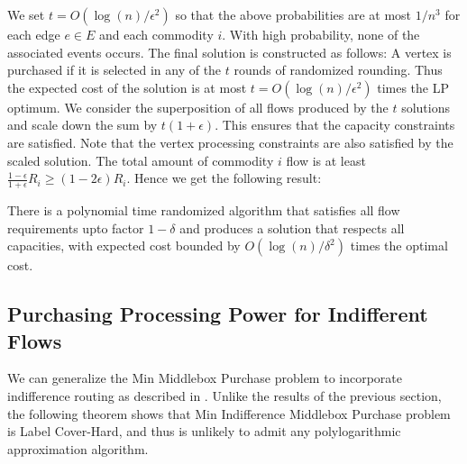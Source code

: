We set $t = O(\log(n)/\epsilon^2)$ so that the above probabilities are at most $1/n^3$ for each edge $e \in E$ and
each commodity $i$. With high probability, none of the associated events occurs.
The final solution is constructed as follows:
A vertex is purchased if it is selected in any of the $t$ rounds of randomized rounding.
Thus the expected cost of the solution is at most $t = O(\log(n)/\epsilon^2)$ times the LP optimum.
We consider the superposition of all flows produced by the $t$ solutions and scale down the
sum by $t(1+\epsilon)$.
This ensures that the capacity constraints are satisfied.
Note that the vertex processing constraints are also satisfied by the scaled solution.
The total amount of commodity $i$ flow is at least $\frac{1-\epsilon}{1+\epsilon} R_i \geq (1-2\epsilon) R_i$.
Hence we get the following result:
\begin{theorem}
There is a polynomial time randomized algorithm that satisfies all flow requirements upto factor $1-\delta$ and produces 
a solution that respects all capacities, with expected cost bounded by $O(\log(n)/\delta^2)$ times the optimal cost.
\end{theorem}


\subsection{Purchasing Processing Power for Indifferent Flows}

We can generalize the {\sc Min Middlebox Purchase} problem to incorporate indifference routing as described in .  Unlike the results of the previous section, the following theorem shows that {\sc Min Indifference Middlebox Purchase} problem is {\sc Label Cover}-Hard, and thus is unlikely to admit any polylogarithmic approximation algorithm.

